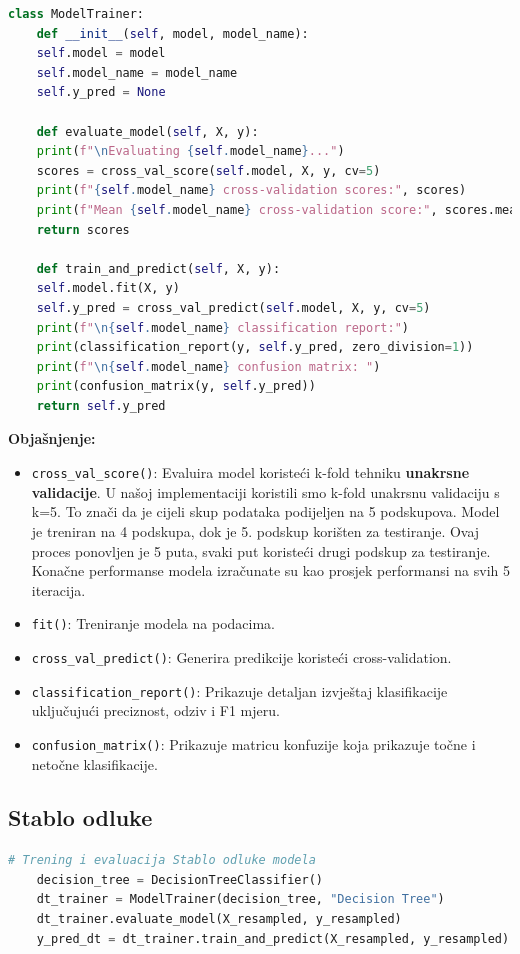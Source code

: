\documentclass[zavrsnirad]{fer}
\begin{document}
\begin{lstlisting}[language=Python, caption={Klasa ModelTrainer}]
	class ModelTrainer:
	def __init__(self, model, model_name):
	self.model = model
	self.model_name = model_name
	self.y_pred = None
	
	def evaluate_model(self, X, y):
	print(f"\nEvaluating {self.model_name}...")
	scores = cross_val_score(self.model, X, y, cv=5)
	print(f"{self.model_name} cross-validation scores:", scores)
	print(f"Mean {self.model_name} cross-validation score:", scores.mean())
	return scores
	
	def train_and_predict(self, X, y):
	self.model.fit(X, y)
	self.y_pred = cross_val_predict(self.model, X, y, cv=5)
	print(f"\n{self.model_name} classification report:")
	print(classification_report(y, self.y_pred, zero_division=1))
	print(f"\n{self.model_name} confusion matrix: ")
	print(confusion_matrix(y, self.y_pred))
	return self.y_pred
\end{lstlisting}

\noindent \textbf{Objašnjenje:}
\begin{itemize}
	\item \texttt{cross\_val\_score()}: Evaluira model koristeći k-fold tehniku \textbf{unakrsne validacije}. U našoj implementaciji koristili smo k-fold unakrsnu validaciju s k=5. To znači da je cijeli skup podataka podijeljen na 5 podskupova. Model je treniran na 4 podskupa, dok je 5. podskup korišten za testiranje. Ovaj proces ponovljen je 5 puta, svaki put koristeći drugi podskup za testiranje. Konačne performanse modela izračunate su kao prosjek performansi na svih 5 iteracija.
	\item \texttt{fit()}: Treniranje modela na podacima.
	\item \texttt{cross\_val\_predict()}: Generira predikcije koristeći cross-validation.
	\item \texttt{classification\_report()}: Prikazuje detaljan izvještaj klasifikacije uključujući preciznost, odziv i F1 mjeru.
	\item \texttt{confusion\_matrix()}: Prikazuje matricu konfuzije koja prikazuje točne i netočne klasifikacije.
\end{itemize}


\subsection{Stablo odluke}

\begin{lstlisting}[language=Python, caption={Trening i evaluacija Stablo odluke modela}]
	# Trening i evaluacija Stablo odluke modela
	decision_tree = DecisionTreeClassifier()
	dt_trainer = ModelTrainer(decision_tree, "Decision Tree")
	dt_trainer.evaluate_model(X_resampled, y_resampled)
	y_pred_dt = dt_trainer.train_and_predict(X_resampled, y_resampled)
\end{lstlisting}
\end{document}
